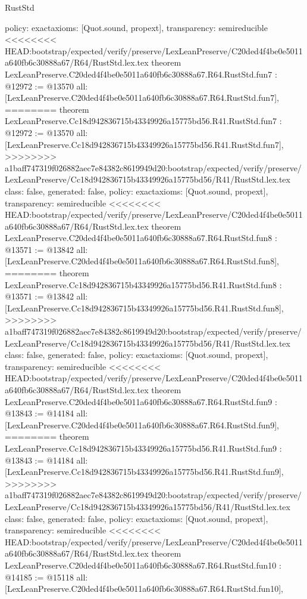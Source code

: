 \begin{lexlean}{RustStd}
\begin{coremodule}
{\begin{coremodule}
{{{{{{{{{{  policy: exact{axioms: [Quot.sound, propext]},
  transparency: semireducible
}
<<<<<<<< HEAD:bootstrap/expected/verify/preserve/LexLeanPreserve/C20ded4f4be0e5011a640fb6c30888a67/R64/RustStd.lex.tex
theorem LexLeanPreserve.C20ded4f4be0e5011a640fb6c30888a67.R64.RustStd.fun7 : @12972 := @13570 {
  all: [LexLeanPreserve.C20ded4f4be0e5011a640fb6c30888a67.R64.RustStd.fun7],
========
theorem LexLeanPreserve.Cc18d942836715b43349926a15775bd56.R41.RustStd.fun7 : @12972 := @13570 {
  all: [LexLeanPreserve.Cc18d942836715b43349926a15775bd56.R41.RustStd.fun7],
>>>>>>>> a1baff747319f026882aec7e84382c8619949d20:bootstrap/expected/verify/preserve/LexLeanPreserve/Cc18d942836715b43349926a15775bd56/R41/RustStd.lex.tex
  class: false,
  generated: false,
  policy: exact{axioms: [Quot.sound, propext]},
  transparency: semireducible
}
<<<<<<<< HEAD:bootstrap/expected/verify/preserve/LexLeanPreserve/C20ded4f4be0e5011a640fb6c30888a67/R64/RustStd.lex.tex
theorem LexLeanPreserve.C20ded4f4be0e5011a640fb6c30888a67.R64.RustStd.fun8 : @13571 := @13842 {
  all: [LexLeanPreserve.C20ded4f4be0e5011a640fb6c30888a67.R64.RustStd.fun8],
========
theorem LexLeanPreserve.Cc18d942836715b43349926a15775bd56.R41.RustStd.fun8 : @13571 := @13842 {
  all: [LexLeanPreserve.Cc18d942836715b43349926a15775bd56.R41.RustStd.fun8],
>>>>>>>> a1baff747319f026882aec7e84382c8619949d20:bootstrap/expected/verify/preserve/LexLeanPreserve/Cc18d942836715b43349926a15775bd56/R41/RustStd.lex.tex
  class: false,
  generated: false,
  policy: exact{axioms: [Quot.sound, propext]},
  transparency: semireducible
}
<<<<<<<< HEAD:bootstrap/expected/verify/preserve/LexLeanPreserve/C20ded4f4be0e5011a640fb6c30888a67/R64/RustStd.lex.tex
theorem LexLeanPreserve.C20ded4f4be0e5011a640fb6c30888a67.R64.RustStd.fun9 : @13843 := @14184 {
  all: [LexLeanPreserve.C20ded4f4be0e5011a640fb6c30888a67.R64.RustStd.fun9],
========
theorem LexLeanPreserve.Cc18d942836715b43349926a15775bd56.R41.RustStd.fun9 : @13843 := @14184 {
  all: [LexLeanPreserve.Cc18d942836715b43349926a15775bd56.R41.RustStd.fun9],
>>>>>>>> a1baff747319f026882aec7e84382c8619949d20:bootstrap/expected/verify/preserve/LexLeanPreserve/Cc18d942836715b43349926a15775bd56/R41/RustStd.lex.tex
  class: false,
  generated: false,
  policy: exact{axioms: [Quot.sound, propext]},
  transparency: semireducible
}
<<<<<<<< HEAD:bootstrap/expected/verify/preserve/LexLeanPreserve/C20ded4f4be0e5011a640fb6c30888a67/R64/RustStd.lex.tex
theorem LexLeanPreserve.C20ded4f4be0e5011a640fb6c30888a67.R64.RustStd.fun10 : @14185 := @15118 {
  all: [LexLeanPreserve.C20ded4f4be0e5011a640fb6c30888a67.R64.RustStd.fun10],
}}}}}}}}}}}}}
\end{coremodule}}
\end{coremodule}
\end{lexlean}
